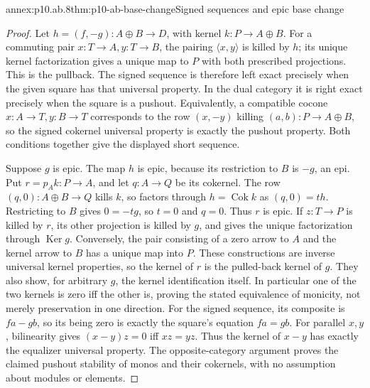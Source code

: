 \begin{annexitem}{annex:p10.ab.8}{thm:p10-ab-base-change}{Signed sequences and epic base change}
\begin{proof}
Let \(h=(f,-g):A\oplus B\to D\), with kernel \(k:P\to A\oplus B\).
For a commuting pair \(x:T\to A,y:T\to B\), the pairing
\(\langle x,y\rangle\) is killed by \(h\); its unique kernel
factorization gives a unique map to \(P\) with both prescribed
projections. This is the pullback. The signed sequence is therefore
left exact precisely when the given square has that universal property.
In the dual category it is right exact precisely when the square is a
pushout. Equivalently, a compatible cocone \(x:A\to T,y:B\to T\)
corresponds to the row \((x,-y)\) killing \((a,b):P\to A\oplus B\),
so the signed cokernel universal property is exactly the pushout
property. Both conditions together give the displayed short sequence.

Suppose \(g\) is epic. The map \(h\) is epic, because its restriction
to \(B\) is \(-g\), an epi. Put \(r=p_Ak:P\to A\), and
let \(q:A\to Q\) be its cokernel. The row \((q,0):A\oplus B\to Q\)
kills \(k\), so factors through \(h=\operatorname{Cok}k\) as
\((q,0)=th\). Restricting to \(B\) gives \(0=-tg\), so \(t=0\)
and \(q=0\). Thus \(r\) is epic.
If \(z:T\to P\) is killed by \(r\), its other projection is killed
by \(g\), and gives the unique factorization through
\(\operatorname{Ker}g\). Conversely, the pair consisting of a zero
arrow to \(A\) and the kernel arrow to \(B\) has a unique map into
\(P\). These constructions are inverse universal kernel properties,
so the kernel of \(r\) is the pulled-back kernel of \(g\).
They also show, for arbitrary \(g\), the kernel identification itself.
In particular one of the two kernels is zero iff the other is, proving
the stated equivalence of monicity, not merely preservation in one direction.
For the signed sequence, its composite is \(fa-gb\), so its being
zero is exactly the square's equation \(fa=gb\). For parallel
\(x,y\), bilinearity gives \((x-y)z=0\) iff \(xz=yz\).
Thus the kernel of \(x-y\) has exactly the equalizer universal property.
The opposite-category argument proves the claimed pushout stability of
monos and their cokernels, with no assumption about modules or elements.
\end{proof}
\end{annexitem}

